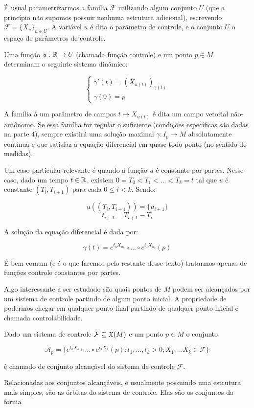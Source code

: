 É usual parametrizarmos a família $\mathcal{F}$ utilizando
algum conjunto $U$ (que a princípio não supomos possuir nenhuma estrutura
adicional),
escrevendo $\mathcal{F} = \{X_u\}_{u \in U}$. A variável $u$ é dita o parâmetro
de controle, e o conjunto $U$ o espaço de parâmetros de controle.

Uma função $u: \mathbb{R} \to U$ (chamada função controle) e um ponto $p \in M$ determinam
o seguinte sistema dinâmico:

$$\begin{cases}
    \gamma'(t) = (X_{u(t)})_{\gamma(t)}\\
    \gamma(0) = p
\end{cases}$$

A família à um parâmetro de campos $t \mapsto X_{u(t)}$
é dita um campo vetorial não-autônomo.
Se essa família for regular o suficiente (condições específicas são dadas na parte 4),
sempre existirá uma solução maximal $\gamma: I_p \to M$ absolutamente contínua
e que satisfaz
a equação diferencial em quase todo ponto (no sentido de medidas).

Um caso particular relevante é quando a função $u$ é constante por partes.
Nesse caso, dado um tempo $t \in \mathbb{R}$, existem $0 = T_0 < T_1< \dots< T_k = t$
tal que $u$ é constante
$(T_i, T_{i+1})$ para cada $0 \leq i < k$.
Sendo:

$$u((T_i,T_{i+1})) = \{u_{i+1}\}$$
$$t_{i+1} = T_{i+1} - T_i$$

A solução da equação diferencial é dada por:

$$\gamma(t) = e^{t_kX_{u_k}} \circ \dots \circ e^{t_1X_{u_1}} (p)$$

É bem comum (e é o que faremos pelo restante desse texto) tratarmos
apenas de funções controle constantes por partes.

Algo interessante
a ser estudado são quais pontos de $M$ podem ser alcançados
por um sistema de controle partindo de algum ponto inicial.
A propriedade de podermos chegar em qualquer
ponto final partindo de qualquer ponto inicial
é chamada controlabilidade.

Dado um sistema de controle $\mathcal{F} \subseteq \mathfrak{X}(M)$ e um ponto
$p \in M$
o conjunto

$$\mathcal{A}_p = \{e^{t_kX_k} \circ \dots \circ e^{t_1X_1} (p) :
t_1, \dots, t_k > 0 ; X_1, \dots X_k \in \mathcal{F}\}$$

é chamado de conjunto alcançável do sistema de controle $\mathcal{F}$.

Relacionadas aos conjuntos alcançáveis,
e usualmente possuindo uma estrutura mais simples,
são as órbitas do sistema de controle.
Elas são os conjuntos da forma

